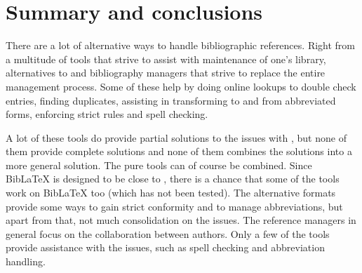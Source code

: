 







\section{Summary and conclusions}
There are a lot of alternative ways to handle
bibliographic references.  Right from a multitude of tools that strive
to assist with maintenance of one's {\bibtex} library, alternatives to
{\bibtex} and bibliography managers that strive to replace the entire
management process.  Some of these help by doing online lookups to
double check entries, finding duplicates, assisting in transforming to
and from abbreviated forms, enforcing strict rules and spell checking.

A lot of these tools do provide partial solutions to the issues with
{\bibtex}, but none of them provide complete solutions and none of
them combines the solutions into a more general solution.  The pure
{\bibtex} tools can of course be combined.  Since Bib{\LaTeX} is
designed to be close to {\bibtex}, there is a chance that some of the
{\bibtex} tools work on Bib{\LaTeX} too (which has not been tested).
The alternative formats provide some ways to gain strict conformity
and to manage abbreviations, but apart from that, not much
consolidation on the issues.  The reference managers in general focus
on the collaboration between authors.  Only a few of the tools provide
assistance with the issues, such as spell checking and abbreviation
handling.


